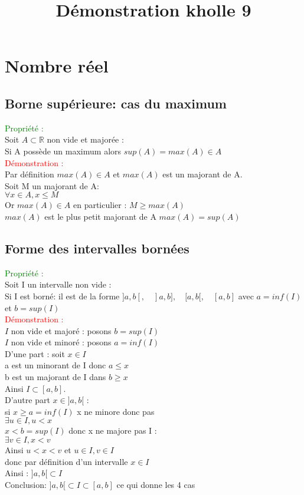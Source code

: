 \documentclass{article}
\begin{document}
\title{Démonstration kholle 9}
\date{}
\maketitle
	\renewcommand{\thesection}{\Roman{section}}
	\setlength{\parindent}{1.5cm}
	\section{Nombre réel}
	\subsection{Borne supérieure: cas du maximum}
	\textcolor{green}{Propriété :} \\ 
 Soit $ A \subset \mathbb{R}$ non vide et majorée : \\ 
	Si A possède un maximum alors $sup(A)=max(A) \in A$ \\ 
	\textcolor{red}{Démonstration :} \\ 
	Par définition $max(A) \in A$ et $max(A)$ est un majorant de A. \\ 
	Soit M un majorant de A: \\ 
	$\forall x \in A, x\leq M$ \\ 
	Or $max(A) \in A$ en particulier : $M \geq max(A)$ \\ 
	$max(A)$ est le plus petit majorant de A $max(A)=sup(A)$
	\subsection{Forme des intervalles bornées}
	\textcolor{green}{Propriété :} \\ 
	Soit I un intervalle non vide : \\ 
	Si I est borné: il est de la forme $]a,b[,\quad ]a,b],\quad [a,b[,\quad[a, b]$ avec $a=inf(I)$ et $b=sup(I)$ \\ 
	\textcolor{red}{Démonstration :} \\ 
	$I$ non vide et majoré : posons $b=sup(I)$ \\ 
	$I$ non vide et minoré : posons $a=inf(I)$ \\ 
	D'une part : soit $x \in I$ \\ 
	a est un minorant de I donc $a \leq x$ \\ 
	b est un majorant de I dans $b \geq x$ \\ 
	Ainsi $I \subset [a,b]$. \\ 
	D'autre part $x \in ]a,b[$ : \\ 
	    si $x \geq a=inf(I)$ x ne minore donc pas  \\ 
	    $\exists u \in I, u< x$ \\ 
	$x<b=sup(I)$ donc x ne majore pas I : \\ 
	$\exists v \in I, x < v$ \\ 
	Ainsi $ u < x < v$ et $u \in I, v \in I$ \\ 
	donc par définition d'un intervalle $x \in I$ \\ 
	Ainsi : $]a,b[ \subset I$ \\ 
	Conclusion: $]a,b[ \subset I \subset [a,b] $ ce qui donne les 4 cas 
\end{document}
